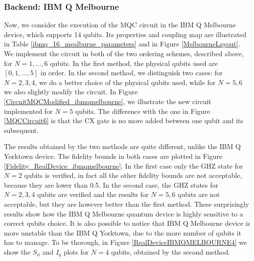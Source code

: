 \newpage

\subsubsection{Backend: IBM Q Melbourne}

Now, we consider the execution of the MQC circuit in the IBM Q Melbourne device, which supports 14 qubits.
 Its properties and coupling map are illustrated in Table \ref{ibmq_16_mealburne_parameters} and in Figure \ref{MelbourneLayout}. 
 We implement the circuit in both of the two ordering schemes, described above, for $N=1,\dots,6$ qubits.
 In the first method, the physical qubits used are $[0,1,\dots, 5]$ in order.
  In the second method, we distinguish two cases: for $N=2,3,4$, we do a better choice of the physical qubits used, while for $N=5,6$ we also slightly modify the circuit. 
 In Figure \ref{CircuitMQCModified_ibmqmelbourne}, we illustrate the new circuit implemented for $N=5$ qubits. The difference with the one in Figure \ref{MQCCircuit6} is that the CX gate is no more added between one qubit and its subsequent.

The results obtained by the two methods are quite different, unlike the IBM Q Yorktown device.
 The fidelity bounds in both cases are plotted in Figure \ref{Fidelity_RealDevice_ibmqmelbourne}.
  In the first case only the GHZ state for $N=2$ qubits is verified, in fact all the other fidelity bounds are not acceptable, because they are lower than 0.5.
   In the second case, the GHZ states for $N=2,3,4$ qubits are verified and the results for $N=5,6$ qubits are not acceptable, but they are however better than the first method. These surprisingly results show how the IBM Q Melbourne quantum device is highly sensitive to a correct qubits choice. It is also possible to notice that IBM Q Melbourne device is more unstable than the IBM Q Yorktown, due to the more number of qubits it has to manage. 
   To be thorough, in Figure \ref{RealDeviceIBMQMELBOURNE4} we show the $S_{\phi}$ and $I_q$ plots for $N=4$ qubits, obtained by the second method. 

